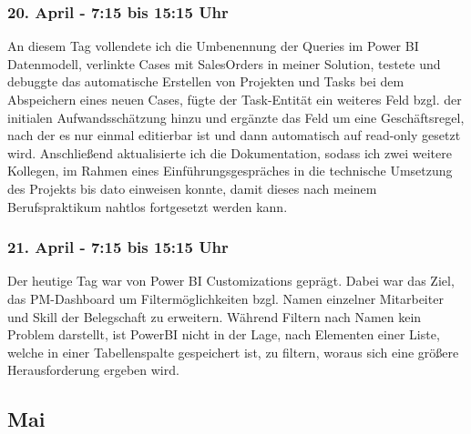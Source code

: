 \subsubsection*{20. April - 7:15 bis 15:15 Uhr}
An diesem Tag vollendete ich die Umbenennung der Queries im Power BI Datenmodell, verlinkte Cases mit SalesOrders in meiner Solution, testete und debuggte das automatische Erstellen von Projekten und Tasks bei dem Abspeichern eines neuen Cases, fügte der Task-Entität ein weiteres Feld bzgl. der initialen Aufwandsschätzung hinzu und ergänzte das Feld um eine Geschäftsregel, nach der es nur einmal editierbar ist und dann automatisch auf read-only gesetzt wird. Anschließend aktualisierte ich die Dokumentation, sodass ich zwei weitere Kollegen, im Rahmen eines Einführungsgespräches in die technische Umsetzung des Projekts bis dato einweisen konnte, damit dieses nach meinem Berufspraktikum nahtlos fortgesetzt werden kann. 

\subsubsection*{21. April - 7:15 bis 15:15 Uhr}
Der heutige Tag war von Power BI Customizations geprägt. Dabei war das Ziel, das PM-Dashboard um Filtermöglichkeiten bzgl. Namen einzelner Mitarbeiter und Skill der Belegschaft zu erweitern. Während Filtern nach Namen kein Problem darstellt, ist PowerBI nicht in der Lage, nach Elementen einer Liste, welche in einer Tabellenspalte gespeichert ist, zu filtern, woraus sich eine größere Herausforderung ergeben wird.

\subsection{Mai}
